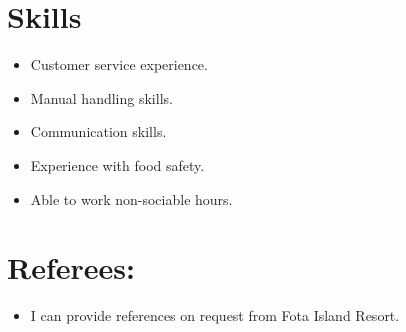 \documentclass{article}
\begin{document}
\section{Skills}
\begin{itemize}
\item Customer service experience.
\item Manual handling skills.
\item Communication skills.
\item Experience with food safety.
\item Able to work non-sociable hours.
\end{itemize}
\section{Referees:}
\begin{itemize}
\item I can provide references on request from Fota Island Resort.
\end{itemize}
\end{document}
